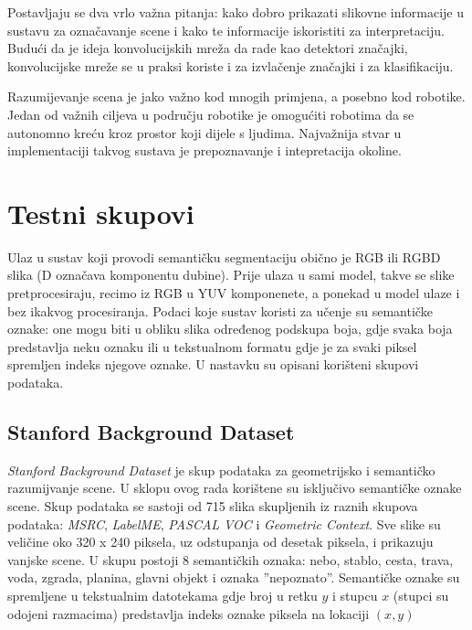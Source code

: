 \documentclass[times, utf8, diplomski, numeric]{fer}
\begin{document}
Postavljaju se dva vrlo važna pitanja: kako dobro prikazati slikovne informacije u sustavu za označavanje scene i kako te informacije iskoristiti za interpretaciju. Budući da je ideja konvolucijskih mreža da rade kao detektori značajki, konvolucijske mreže se u praksi koriste i za izvlačenje značajki i za klasifikaciju.

Razumijevanje scena je jako važno kod mnogih primjena, a posebno kod robotike. Jedan od važnih ciljeva u području robotike je omogućiti robotima da se autonomno kreću kroz prostor koji dijele s ljudima. Najvažnija stvar u implementaciji takvog sustava je prepoznavanje i intepretacija okoline.


\section{Testni skupovi}

Ulaz u sustav koji provodi semantičku segmentaciju obično je RGB ili RGBD slika (D označava komponentu dubine).
Prije ulaza u sami model, takve se slike pretprocesiraju, recimo iz RGB u YUV komponenete, a ponekad u model ulaze i bez ikakvog procesiranja. Podaci koje sustav koristi za učenje su semantičke oznake: one mogu biti u obliku slika određenog podskupa boja, gdje svaka boja predstavlja neku oznaku ili u tekstualnom formatu gdje je za svaki piksel spremljen indeks njegove oznake. U nastavku su opisani korišteni skupovi podataka.


\subsection{Stanford Background Dataset}

\textit{Stanford Background Dataset}\cite{gould_09} je skup podataka za geometrijsko i semantičko razumijvanje scene. U sklopu ovog rada korištene su isključivo semantičke oznake scene. Skup podataka se sastoji od 715 slika skupljenih iz raznih skupova podataka: \textit{MSRC}, \textit{LabelME}, \textit{PASCAL VOC} i \textit{Geometric Context}. Sve slike su veličine oko 320 x 240 piksela, uz odstupanja od desetak piksela, i prikazuju vanjske scene.
U skupu postoji 8 semantičkih oznaka: nebo, stablo, cesta, trava, voda, zgrada, planina, glavni objekt i oznaka ''nepoznato''. Semantičke oznake su spremljene u tekstualnim datotekama gdje broj u retku $y$ i stupcu $x$ (stupci su odojeni razmacima) predstavlja indeks oznake piksela na lokaciji $(x, y)$

\begin{bchart}[step=5,max=40,unit=\%]
      \smallskip
      \smallskip
      \smallskip
      \smallskip
      \smallskip
      \smallskip
      \smallskip
      \smallskip
\end{bchart}
\end{document}
